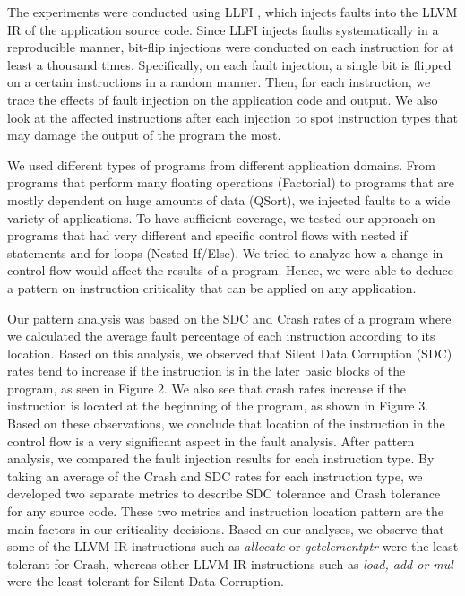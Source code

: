 The experiments were conducted using LLFI \cite{LLFI:2015}, which injects faults into the LLVM IR of the application source code. Since LLFI injects faults systematically in a reproducible manner, bit-flip injections were conducted on each instruction for at least a thousand times. Specifically, on each fault injection, a single bit is flipped on a certain instructions in a random manner. Then, for each instruction, we trace the effects of fault injection on the application code and output. We also look at the affected instructions after each injection to spot instruction types that may damage the output of the program the most. 

We used different types of programs from different application domains. From programs that perform many floating operations (Factorial) to programs that are mostly dependent on huge amounts of data (QSort), we injected faults to a wide variety of applications. To have sufficient coverage, we tested our approach on programs that had very different and specific control flows with nested if statements and for loops (Nested If/Else). We tried to analyze how a change in control flow would affect the results of a program. Hence, we were able to deduce a pattern on instruction criticality that can be applied on any application.
 
Our pattern analysis was based on the SDC and Crash rates of a program where we calculated the average fault percentage of each instruction according to its location. Based on this analysis, we observed that Silent Data Corruption (SDC) rates tend to increase if the instruction is in the later basic blocks of the program, as seen in Figure 2. We also see that crash rates increase if the instruction is located at the beginning of the program, as shown in Figure 3. Based on these observations, we conclude that location of the instruction in the control flow is a very significant aspect in the fault analysis. After pattern analysis, we compared the fault injection results for each instruction type. By taking an average of the Crash and SDC rates for each instruction type, we developed two separate metrics to describe SDC tolerance and Crash tolerance for any source code. These two metrics and instruction location pattern are the main factors in our criticality decisions. Based on our analyses, we observe that some of the LLVM IR instructions such as {\em allocate} or {\em getelementptr} were the least tolerant for Crash, whereas other LLVM IR instructions such as {\em load, add or mul} were the least tolerant for Silent Data Corruption. 


